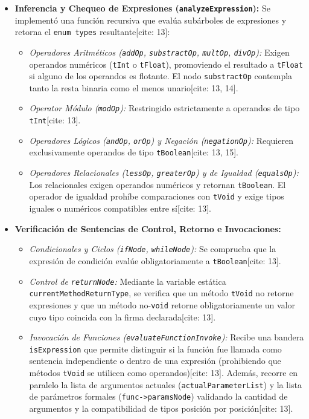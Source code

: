 \documentclass[12pt, a4paper]{article}
\begin{document}
\begin{itemize}
    \item \textbf{Inferencia y Chequeo de Expresiones (\texttt{analyzeExpression}):} Se implementó una función recursiva que evalúa subárboles de expresiones y retorna el \texttt{enum types} resultante[cite: 13]:
    \begin{itemize}
        \item \textit{Operadores Aritméticos (\texttt{addOp}, \texttt{substractOp}, \texttt{multOp}, \texttt{divOp}):} Exigen operandos numéricos (\texttt{tInt} o \texttt{tFloat}), promoviendo el resultado a \texttt{tFloat} si alguno de los operandos es flotante. El nodo \texttt{substractOp} contempla tanto la resta binaria como el menos unario[cite: 13, 14].
        \item \textit{Operator Módulo (\texttt{modOp}):} Restringido estrictamente a operandos de tipo \texttt{tInt}[cite: 13].
        \item \textit{Operadores Lógicos (\texttt{andOp}, \texttt{orOp}) y Negación (\texttt{negationOp}):} Requieren exclusivamente operandos de tipo \texttt{tBoolean}[cite: 13, 15].
        \item \textit{Operadores Relacionales (\texttt{lessOp}, \texttt{greaterOp}) y de Igualdad (\texttt{equalsOp}):} Los relacionales exigen operandos numéricos y retornan \texttt{tBoolean}. El operador de igualdad prohíbe comparaciones con \texttt{tVoid} y exige tipos iguales o numéricos compatibles entre sí[cite: 13].
    \end{itemize}

    \item \textbf{Verificación de Sentencias de Control, Retorno e Invocaciones:}
    \begin{itemize}
        \item \textit{Condicionales y Ciclos (\texttt{ifNode}, \texttt{whileNode}):} Se comprueba que la expresión de condición evalúe obligatoriamente a \texttt{tBoolean}[cite: 13].
        \item \textit{Control de \texttt{returnNode}:} Mediante la variable estática \texttt{currentMethodReturnType}, se verifica que un método \texttt{tVoid} no retorne expresiones y que un método no-\texttt{void} retorne obligatoriamente un valor cuyo tipo coincida con la firma declarada[cite: 13].
        \item \textit{Invocación de Funciones (\texttt{evaluateFunctionInvoke}):} Recibe una bandera \texttt{isExpression} que permite distinguir si la función fue llamada como sentencia independiente o dentro de una expresión (prohibiendo que métodos \texttt{tVoid} se utilicen como operandos)[cite: 13]. Además, recorre en paralelo la lista de argumentos actuales (\texttt{actualParameterList}) y la lista de parámetros formales (\texttt{func->paramsNode}) validando la cantidad de argumentos y la compatibilidad de tipos posición por posición[cite: 13].
    \end{itemize}
\end{itemize}
\end{document}
